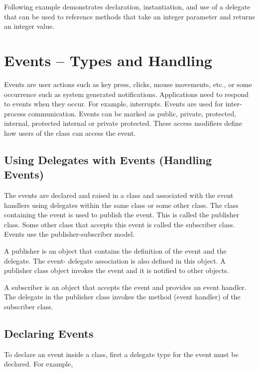Following example demonstrates declaration, instantiation, and use of a delegate that can be used to
reference methods that take an integer parameter and returns an integer value.





\section{Events – Types and Handling}
Events are user actions such as key press, clicks, mouse movements, etc., or some occurrence such
as system generated notifications. Applications need to respond to events when they occur. For
example, interrupts. Events are used for inter-process communication. Events can be marked as
public, private, protected, internal, protected internal or private protected. These access modifiers
define how users of the class can access the event.

\subsection*{Using Delegates with Events (Handling Events)}
The events are declared and raised in a class and associated with the event handlers using delegates
within the same class or some other class. The class containing the event is used to publish the event. This is called the publisher class. Some other class that accepts this event is called the
subscriber class. Events use the publisher-subscriber model.

A publisher is an object that contains the definition of the event and the delegate. The event-
delegate association is also defined in this object. A publisher class object invokes the event and it is
notified to other objects.

A subscriber is an object that accepts the event and provides an event handler. The delegate in the
publisher class invokes the method (event handler) of the subscriber class.

\subsection*{Declaring Events}
To declare an event inside a class, first a delegate type for the event must be declared. For example,

